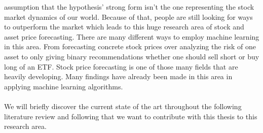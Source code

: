 \documentclass[a4paper,12pt]{report}
\begin{document}
assumption that the hypothesis’ strong form isn’t the one representing the stock market dynamics of our world. Because of that, people are still looking for ways to outperform the market which leads to this huge research area of stock and asset price forecasting. There are many different ways to employ machine learning in this area. From forecasting concrete stock prices over analyzing the risk of one asset to only giving binary recommendations whether one should sell short or buy long of an ETF. Stock price forecasting is one of those many fields that are heavily developing. Many findings have already been made in this area in applying machine learning algorithms. \\
\\
We will briefly discover the current state of the art throughout the following literature review and following that we want to contribute with this thesis to this research area.
\end{document}

